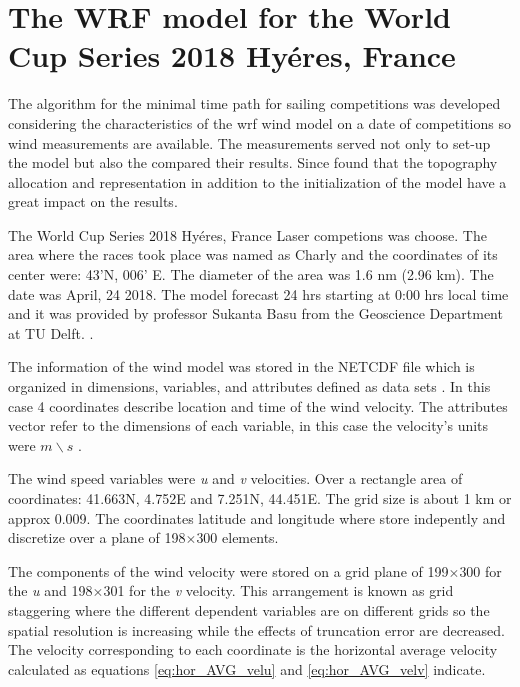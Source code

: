 \section{The WRF model for the World Cup Series 2018 Hyéres, France}

The algorithm for the minimal time path for sailing competitions was developed considering the characteristics of the \acrshort{wrf} wind model on a date of competitions so wind measurements are available. The measurements served not only to set-up the model but also the compared their results. Since \cite{giannaros2018ultrahigh} found that the topography allocation and representation in addition to the initialization of the model have a great impact on the results. \par

The World Cup Series 2018 Hyéres, France Laser competions was choose. The area where the races took place was named as Charly and the coordinates of its center were: 43'N, 006' E. The diameter of the area was 1.6 nm (2.96 km). The date was April, 24 2018. The model forecast 24 hrs starting at 0:00 hrs local time and it was provided by professor Sukanta Basu from the Geoscience Department at TU Delft. . \par 

The information of the wind model was stored in the NETCDF file which is organized in dimensions, variables, and attributes defined as data sets \cite{netcdf56302}. In this case 4 coordinates describe location and time of %
the wind velocity. The attributes vector refer to the dimensions of each variable, in this case the velocity's units were $m \backslash s $ . \par 

The wind speed variables were \textit{u} and \textit{v} velocities. Over a rectangle area of coordinates: 41.663\degree N, 4.752\degree E and 7.251\degree N, 44.451\degree E. The grid size is about 1 km or approx 0.009\degree. The coordinates latitude and longitude where store indepently and discretize over a plane of 198$\times$300 elements. \par 
The components of the wind velocity were stored on a grid plane of 199$\times$300 for the \textit{u} and 198$\times$301 for the \textit{v} velocity. This arrangement is known as grid staggering where the different dependent variables are on different grids so the spatial resolution is increasing while the effects of truncation error are decreased. The velocity corresponding to each coordinate is the horizontal average velocity calculated as equations \ref{eq:hor_AVG_velu} and \ref{eq:hor_AVG_velv} indicate.  \par  %

